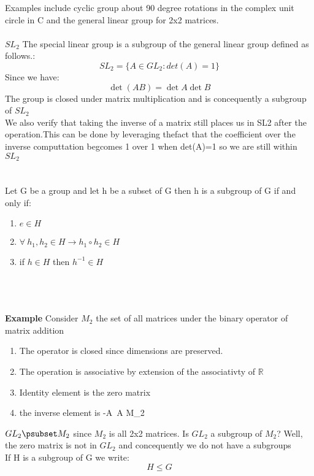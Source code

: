\documentclass[11pt]{article}
\theoremstyle{definition}  %
\newcommand{\bigline}{\\\noindent\makebox[\linewidth]{\rule{\paperwidth}{0.4pt}}\\}
\begin{document}
Examples include cyclic group about 90 degree rotations in the complex unit circle in C and  the general linear group for 2x2 matrices. \\\\
 $SL_2$ The special linear group is a subgroup of the general linear group defined as follows.:
\[
  SL_2=\{A\in GL_2: det(A)=1\}
\]
Since we have:
\[
  \det(AB)=\det A\det B
\]
The group is closed under matrix multiplication and is concequently a subgroup of $SL_2$ \\
We also verify that taking the inverse of a matrix still places us in SL2 after the operation.This can be done by leveraging thefact that the coefficient over the inverse computtation begcomes 1 over 1 when det(A)=1 so we are still within $SL_2$
\\
\bigline
\proposition Let G be a group and let h be a subset of G then h is a subgroup of G if and only if:
\begin{enumerate}
  \item $e\in H$
  \item  $\forall\ h_1,h_2\in H \rightarrow h_1\circ h_2 \in H$
  \item if $h\in H$ then $h^{-1}\in H$
\end{enumerate}
\\
\bigline
\textbf{Example} Consider $M_2$ the set of all matrices under the binary operator of matrix addition\\
\begin{enumerate}
  \item The operator is closed since dimensions are preserved.
  \item The operation is associative by extension of the associativty of $\mathbb{R}$
  \item Identity element is the zero matrix
  \item the inverse element is -A\forall\ A \in M_2
\end{enumerate}
\proposition $GL_2\psubset M_2$ since $M_2$ is all 2x2 matrices. Is $GL_2$ a subgroup of $M_2$? Well, the zero matrix is not in $GL_2$ and concequently we do not have a subgroups
\\
 If H is a subgroup of G we write:
\[
  H\leq G
\]
\end{document}
